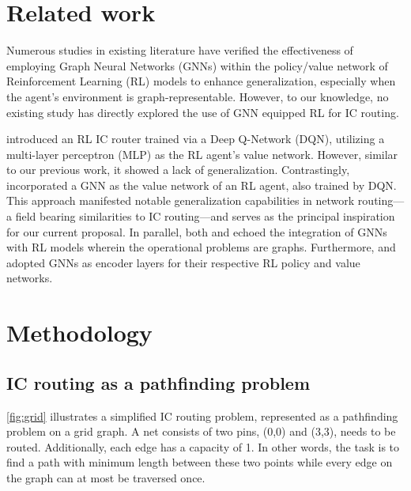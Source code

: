 \documentclass[letterpaper]{article}
\begin{document}



\section{Related work}
Numerous studies in existing literature have verified the effectiveness of employing Graph Neural Networks (GNNs) within the policy/value network of Reinforcement Learning (RL) models to enhance generalization, especially when the agent’s environment is graph-representable. However, to our knowledge, no existing study has directly explored the use of GNN equipped RL for IC routing.

\cite{Liao2020} introduced an RL IC router trained via a Deep Q-Network (DQN), utilizing a multi-layer perceptron (MLP) as the RL agent's value network. However, similar to our previous work, it showed a lack of generalization. Contrastingly, \cite{Almasan2022} incorporated a GNN as the value network of an RL agent, also trained by DQN. This approach manifested notable generalization capabilities in network routing—a field bearing similarities to IC routing—and serves as the principal inspiration for our current proposal. In parallel, both \cite{Chen2023} and \cite{Wang2018} echoed the integration of GNNs with RL models wherein the operational problems are graphs. Furthermore, \cite{Mirhoseini2021} and \cite{Yue2022} adopted GNNs as encoder layers for their respective RL policy and value networks.

    
\section{Methodology}

\subsection{IC routing as a pathfinding problem}
\autoref{fig:grid} illustrates a simplified IC routing problem, represented as a pathfinding problem on a grid graph. A net consists of two pins, (0,0) and (3,3), needs to be routed. Additionally, each edge has a capacity of 1. In other words, the task is to find a path with minimum length between these two points while every edge on the graph can at most be traversed once.
\end{document}
